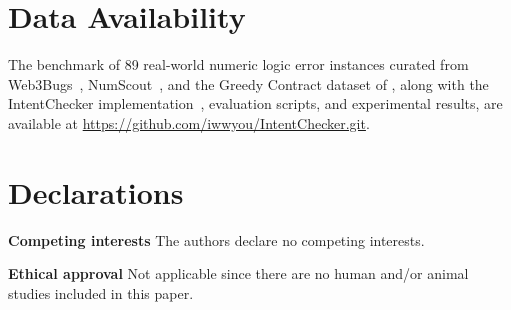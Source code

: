 \documentclass[pdflatex,sn-basic]{sn-jnl}%
\theoremstyle{thmstyleone}%
\theoremstyle{thmstyletwo}%
\theoremstyle{thmstylethree}%
\begin{document}
\section*{Data Availability}
The benchmark of 89 real-world numeric logic error instances curated from Web3Bugs~\citep{exploitablebugs}, NumScout~\citep{numscout}, and the Greedy Contract dataset of \citet{flyinointment}, along with the IntentChecker implementation~\citep{intentchecker}, evaluation scripts, and experimental results, are available at \url{https://github.com/iwwyou/IntentChecker.git}.

\section*{Declarations}

\noindent\textbf{Competing interests} The authors declare no competing interests.

\noindent\textbf{Ethical approval} Not applicable since there are no human and/or animal studies included in this paper.
\end{document}
